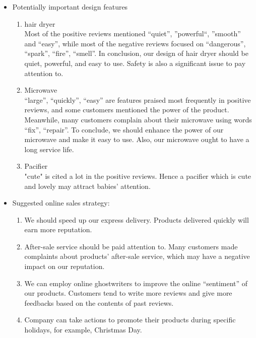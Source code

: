 \documentclass{mcmthesis}
\begin{document}
\begin{itemize}
  \item Potentially important design features \\
   \begin{enumerate}
     \item hair dryer \\
     Most of the positive reviews mentioned “quiet”, ”powerful“, ”smooth” and “easy”, while most of the negative reviews focused on “dangerous”, “spark”, “fire”, “smell”. In conclusion, our design of hair dryer should be quiet, powerful, and easy to use. Safety is also a significant issue to pay attention to.
    \item Microwave \\
    “large”, “quickly”, “easy” are features praised most frequently in positive reviews, and some customers mentioned the power of the product. Meanwhile, many customers complain about their microwave using words “fix”, “repair”. To conclude, we should enhance the power of our microwave and make it easy to use. Also, our microwave ought to have a long service life.
    \item Pacifier \\
    "cute" is cited a lot in the positive reviews. Hence a pacifier which is cute and lovely may attract babies’ attention.
   \end{enumerate}
   \item Suggested online sales strategy: \\
    \begin{enumerate}
      \item We should speed up our express delivery. Products delivered quickly will earn more reputation.
      \item After-sale service should be paid attention to. Many customers made complaints about products’ after-sale service, which may have a negative impact on our reputation.
      \item We can employ online ghostwriters to improve the online “sentiment” of our products. Customers tend to write more reviews and give more feedbacks based on the contents of past reviews. 
      \item Company can take actions to promote their products during specific holidays, for example, Christmas Day.
    \end{enumerate}
\end{itemize}




\newpage
\end{document}
